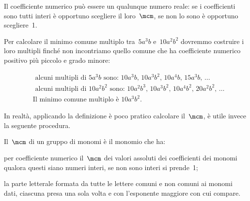Il coefficiente numerico può essere un qualunque numero reale: se i
coefficienti sono tutti interi è opportuno scegliere il loro~$\mcm$,
se non lo sono è opportuno scegliere~1.

 \begin{esempio}
Per calcolare il minimo comune multiplo tra~$5a^{3}b$ e~$10a^{2}b^{2}$ dovremmo costruire i loro multipli finché non
incontriamo quello comune che ha coefficiente numerico positivo più
piccolo e grado minore:



\begin{equation*}
\begin{split}
& \text{ alcuni multipli di }5a^{3}b\text{ sono: } 10a^{3}b\text{,~}10a^{3}b^{2}\text{,~}10a^{4}b\text{,~}15a^{3}b\text{,~}\ldots \\
& \text{ alcuni multipli di }10a^{2}b^{2}\text{ sono: } 10a^{2}b^{3}\text{,~}10a^{3}b^{2}\text{,~}10a^{4}b^{2}\text{,~}20a^{2}b^{2}\text{,~}\ldots \\
& \text{Il minimo comune multiplo è }10a^{3}b^{2}.
\end{split}
\end{equation*}
 \end{esempio}

In realtà, applicando la definizione è poco pratico calcolare il~$\mcm$, è utile invece la seguente procedura.

\begin{procedura}
Il~$\mcm$ di un gruppo di monomi è il monomio che ha:

\begin{enumeratea}
 \item per coefficiente numerico il~$\mcm$ dei valori assoluti dei
coefficienti dei monomi qualora
questi siano numeri interi, se non sono interi si prende~1;
 \item la parte letterale formata da tutte le lettere comuni e non comuni
ai monomi dati, ciascuna
presa una sola volta e con l'esponente maggiore con
cui compare.
\end{enumeratea}
\end{procedura}

